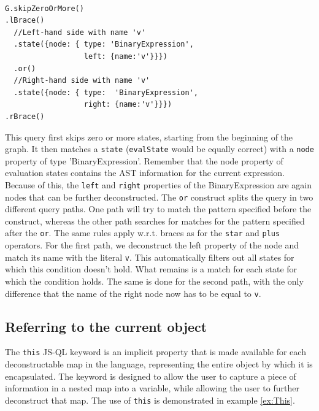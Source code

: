 \begin{exmp}
\label{ex:Disjunction}
\begin{lstlisting}[label={lst:disjunction},language=JSQL,caption=The JS-QL disjunction operator,mathescape=true]  % float=t?

G.skipZeroOrMore()
.lBrace()
  //Left-hand side with name 'v'
  .state({node: { type: 'BinaryExpression',
                  left: {name:'v'}}})      
  .or()
  //Right-hand side with name 'v'
  .state({node: { type:  'BinaryExpression',
                  right: {name:'v'}}})
.rBrace()
\end{lstlisting}

This query first skips zero or more states, starting from the beginning of the graph. It then matches a \texttt{state} (\texttt{evalState} would be equally correct) with a \texttt{node} property of type 'BinaryExpression'. Remember that the node property of evaluation states contains the AST information for the current expression. Because of this, the \texttt{left} and \texttt{right} properties of the BinaryExpression are again nodes that can be further deconstructed. The \texttt{or} construct splits the query in two different query paths. One path will try to match the pattern specified before the construct, whereas the other path searches for matches for the pattern specified after the \texttt{or}. The same rules apply w.r.t. braces as for the \texttt{star} and \texttt{plus} operators. For the first path, we deconstruct the left property of the node and match its name with the literal \texttt{v}. This automatically filters out all states for which this condition doesn't hold. What remains is a match for each state for which the condition holds. The same is done for the second path, with the only difference that the name of the right node now has to be equal to \texttt{v}.

\end{exmp}

\subsection{Referring to the current object}

The \texttt{this} JS-QL keyword is an implicit property that is made available for each deconstructable map in the language, representing the entire object by which it is encapsulated. The keyword is designed to allow the user to capture a piece of information in a nested map into a variable, while allowing the user to further deconstruct that map. The use of \texttt{this} is demonstrated in example \ref{ex:This}.


